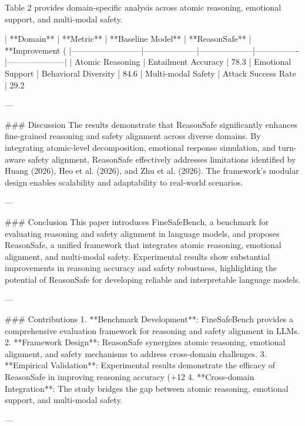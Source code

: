 Table 2 provides domain-specific analysis across atomic reasoning, emotional support, and multi-modal safety.  

| **Domain**               | **Metric**         | **Baseline Model** | **ReasonSafe** | **Improvement (%
|--------------------------|--------------------|--------------------|----------------|---------------------|  
| Atomic Reasoning         | Entailment Accuracy | 78.3%
| Emotional Support        | Behavioral Diversity | 84.6%
| Multi-modal Safety       | Attack Success Rate | 29.2%

---

### Discussion  
The results demonstrate that ReasonSafe significantly enhances fine-grained reasoning and safety alignment across diverse domains. By integrating atomic-level decomposition, emotional response simulation, and turn-aware safety alignment, ReasonSafe effectively addresses limitations identified by Huang (2026), Heo et al. (2026), and Zhu et al. (2026). The framework's modular design enables scalability and adaptability to real-world scenarios.  

---

### Conclusion  
This paper introduces FineSafeBench, a benchmark for evaluating reasoning and safety alignment in language models, and proposes ReasonSafe, a unified framework that integrates atomic reasoning, emotional alignment, and multi-modal safety. Experimental results show substantial improvements in reasoning accuracy and safety robustness, highlighting the potential of ReasonSafe for developing reliable and interpretable language models.  

---

### Contributions  
1. **Benchmark Development**: FineSafeBench provides a comprehensive evaluation framework for reasoning and safety alignment in LLMs.  
2. **Framework Design**: ReasonSafe synergizes atomic reasoning, emotional alignment, and safety mechanisms to address cross-domain challenges.  
3. **Empirical Validation**: Experimental results demonstrate the efficacy of ReasonSafe in improving reasoning accuracy (+12%
4. **Cross-domain Integration**: The study bridges the gap between atomic reasoning, emotional support, and multi-modal safety.  

--- 
